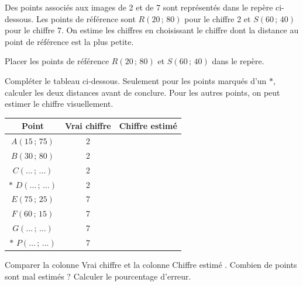 Des points associés aux images de 2 et de 7 sont représentés dans le repère ci-dessous. Les points de référence sont $R(20\,;\,80)$ pour le chiffre 2 et $S(60\,;\,40)$ pour le chiffre 7. On estime les chiffres en choisissant le chiffre dont la distance au point de référence est la plus petite.

	\begin{MADenumerate}

		\item Placer les points de référence $R(20\,;\,80)$ et $S(60\,;\,40)$ dans le repère.

		\item Compléter le tableau ci-dessous. Seulement pour les points marqués d'un $*$, calculer les deux distances avant de conclure. Pour les autres points, on peut estimer le chiffre visuellement.

		\begin{center}
			\begin{tabular}{|c|c|c|}
				\hline
				Point                      & Vrai chiffre & Chiffre estimé \\
				\hline
				$A(15\,;\,75)$             & 2            &                \\
				\hline
				$B(30\,;\,80)$             & 2            &                \\
				\hline
				$C(\ldots\,;\,\ldots)$     & 2            &                \\
				\hline
				$*$ $D(\ldots\,;\,\ldots)$ & 2            &                \\
				\hline
				$E(75\,;\,25)$             & 7            &                \\
				\hline
				$F(60\,;\,15)$             & 7            &                \\
				\hline
				$G(\ldots\,;\,\ldots)$     & 7            &                \\
				\hline
				$*$ $P(\ldots\,;\,\ldots)$ & 7            &                \\
				\hline
			\end{tabular}
		\end{center}

		\item Comparer la colonne \og Vrai chiffre \fg{} et la colonne \og Chiffre estimé \fg{}. Combien de points sont mal estimés ? Calculer le pourcentage d'erreur.

	\end{MADenumerate}


